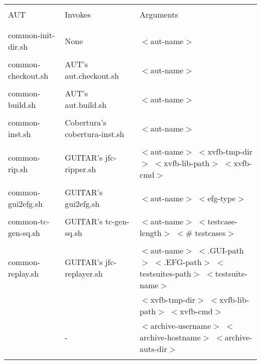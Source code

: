 \begin{table*}
   \centering
   \scriptsize{
   \begin{tabular}{lll}
      \hline
      & & \\
      AUT                  & Invokes & Arguments  \\
      & & \\
      \hline
      & & \\
      common-init-dir.sh   & None                     & $<$aut-name$>$ \\
      & & \\
      common-checkout.sh   & AUT's aut.checkout.sh    & $<$aut-name$>$ \\
      & & \\
      common-build.sh      & AUT's aut.build.sh       & $<$aut-name$>$ \\
      & & \\
      common-inst.sh       & Cobertura's cobertura-inst.sh   & $<$aut-name$>$ \\
      & & \\
      common-rip.sh        & GUITAR's jfc-ripper.sh   & $<$aut-name$>$ $<$xvfb-tmp-dir$>$ $<$xvfb-lib-path$>$ $<$xvfb-cmd$>$ \\
      & & \\
      common-gui2efg.sh    & GUITAR's gui2efg.sh      & $<$aut-name$>$ $<$efg-type$>$ \\
      & & \\
      common-tc-gen-sq.sh  & GUITAR's tc-gen-sq.sh    & $<$aut-name$>$ $<$testcase-length$>$ $<$\# testcases$>$ \\
      & & \\
      common-replay.sh     & GUITAR's jfc-replayer.sh & $<$aut-name$>$ $<$.GUI-path$>$ $<$.EFG-path$>$ $<$testsuites-path$>$ $<$testsuite-name$>$ \\
                           &                          & $<$xvfb-tmp-dir$>$ $<$xvfb-lib-path$>$ $<$xvfb-cmd$>$ \\
                           & -                        & $<$archive-username$>$ $<$archive-hostname$>$ $<$archive-auts-dir$>$ \\
      & & \\
      \hline 
   \end{tabular}

}
\end{table*}
